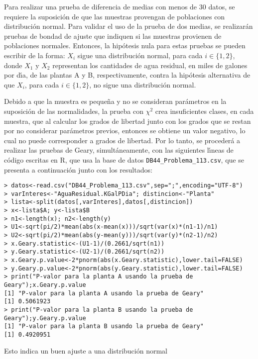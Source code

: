 \begin{solucion}
 Para realizar una prueba de diferencia de medias con menos de 30 datos,
 se requiere la suposici\'on de que las muestras provengan de poblaciones
 con distribuci\'on normal.
 Para validar el uso de la prueba de dos medias, se realizar\'an pruebas
 de bondad de ajuste que indiquen si las muestras provienen de poblaciones
 normales.
 Entonces, la hip\'otesis nula para estas pruebas se pueden
 escribir de la forma: $X_i$ sigue una distribuci\'on normal,
 para cada $i \in \{1,2\}$,
 donde $X_1$ y $X_2$ representan los cantidades de agua residual,
 en miles de galones por d\'{\i}a, de las plantas A y B, respectivamente,
 contra la hip\'otesis alternativa de que $X_i$,
 para cada $i \in \{1,2\}$, no sigue una distribuci\'on normal.
 \par 
 Debido a que la muestra es peque\~na y no se consideran par\'ametros
 en la suposici\'on de las normalidades,
 la prueba con $\chi^2$ crea insuficientes clases, en cada muestra,
 que al calcular los grados de libertad junto con los grados que se restan
 por no considerar par\'ametros previos, entonces se obtiene
 un valor negativo, lo cual no puede corresponder a grados de libertad.
 Por lo tanto, se proceder\'a a realizar las pruebas de Geary,
 simult\'aneamente, con las siguientes l\'{\i}neas de c\'odigo
 escritas en R, que usa la base de datos
 \texttt{DB44\_Problema\_113.csv},
 que se presenta a continuaci\'on junto con los resultados:
 \begin{verbatim}
> datos<-read.csv("DB44_Problema_113.csv",sep=";",encoding="UTF-8")
> varInteres<-"AguaResidual.KGalPDia"; distincion<-"Planta"
> lista<-split(datos[,varInteres],datos[,distincion])
> x<-lista$A; y<-lista$B
> n1<-length(x); n2<-length(y)
> U1<-sqrt(pi/2)*mean(abs(x-mean(x)))/sqrt(var(x)*(n1-1)/n1)
> U2<-sqrt(pi/2)*mean(abs(y-mean(y)))/sqrt(var(y)*(n2-1)/n2)
> x.Geary.statistic<-(U1-1)/(0.2661/sqrt(n1))
> y.Geary.statistic<-(U2-1)/(0.2661/sqrt(n2))
> x.Geary.p.value<-2*pnorm(abs(x.Geary.statistic),lower.tail=FALSE)
> y.Geary.p.value<-2*pnorm(abs(y.Geary.statistic),lower.tail=FALSE)
> print("P-valor para la planta A usando la prueba de Geary");x.Geary.p.value
[1] "P-valor para la planta A usando la prueba de Geary"
[1] 0.5061923
> print("P-valor para la planta B usando la prueba de Geary");y.Geary.p.value
[1] "P-valor para la planta B usando la prueba de Geary"
[1] 0.4920951
 \end{verbatim}
 \vspace{-0.5cm}
 Esto indica un buen ajuste a una distribuci\'on normal

\end{solucion}
